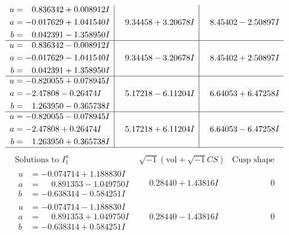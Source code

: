 \documentclass[1p]{elsarticle_modified}
\theoremstyle{definition}
\newcommand{\I}{\sqrt{-1}}
\begin{document}
$$\begin{array}{c|c|c}
\begin{aligned}
u &= \phantom{-}0.836342 + 0.008912 I \\
a &= -0.017629 + 1.041540 I \\
b &= \phantom{-}0.042391 - 1.358950 I\end{aligned}
 & \phantom{-}9.34458 + 3.20678 I & \phantom{-}8.45402 - 2.50897 I \\ \hline\begin{aligned}
u &= \phantom{-}0.836342 - 0.008912 I \\
a &= -0.017629 - 1.041540 I \\
b &= \phantom{-}0.042391 + 1.358950 I\end{aligned}
 & \phantom{-}9.34458 - 3.20678 I & \phantom{-}8.45402 + 2.50897 I \\ \hline\begin{aligned}
u &= -0.820055 + 0.078945 I \\
a &= -2.47808 - 0.26474 I \\
b &= \phantom{-}1.263950 - 0.365738 I\end{aligned}
 & \phantom{-}5.17218 - 6.11204 I & \phantom{-}6.64053 + 6.47258 I \\ \hline\begin{aligned}
u &= -0.820055 - 0.078945 I \\
a &= -2.47808 + 0.26474 I \\
b &= \phantom{-}1.263950 + 0.365738 I\end{aligned}
 & \phantom{-}5.17218 + 6.11204 I & \phantom{-}6.64053 - 6.47258 I\\
 \hline 
 \end{array}$$\newpage$$\begin{array}{c|c|c}  
\text{Solutions to }I^u_{1}& \I (\text{vol} + \sqrt{-1}CS) & \text{Cusp shape}\\
 \hline 
\begin{aligned}
u &= -0.074714 + 1.188830 I \\
a &= \phantom{-}0.891353 - 1.049750 I \\
b &= -0.638314 - 0.584251 I\end{aligned}
 & \phantom{-}0.28440 + 1.43816 I & \phantom{-0.000000 } 0 \\ \hline\begin{aligned}
u &= -0.074714 - 1.188830 I \\
a &= \phantom{-}0.891353 + 1.049750 I \\
b &= -0.638314 + 0.584251 I\end{aligned}
 & \phantom{-}0.28440 - 1.43816 I & \phantom{-0.000000 } 0 \\ \hline\begin{aligned}

\end{aligned}
\end{array}$$
\end{document}
